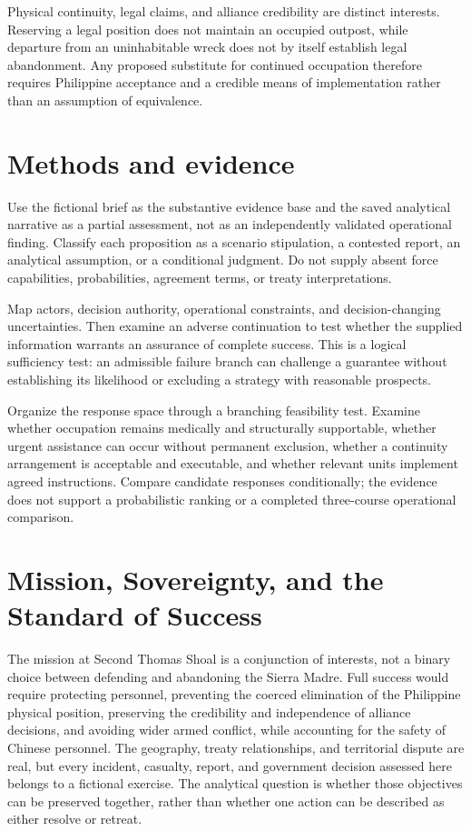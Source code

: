 \documentclass[11pt]{article}
\begin{document}
Physical continuity, legal claims, and alliance credibility are distinct interests. Reserving a legal position does not maintain an occupied outpost, while departure from an uninhabitable wreck does not by itself establish legal abandonment. Any proposed substitute for continued occupation therefore requires Philippine acceptance and a credible means of implementation rather than an assumption of equivalence.

\section{Methods and evidence}
Use the fictional brief as the substantive evidence base and the saved analytical narrative as a partial assessment, not as an independently validated operational finding. Classify each proposition as a scenario stipulation, a contested report, an analytical assumption, or a conditional judgment. Do not supply absent force capabilities, probabilities, agreement terms, or treaty interpretations.

Map actors, decision authority, operational constraints, and decision-changing uncertainties. Then examine an adverse continuation to test whether the supplied information warrants an assurance of complete success. This is a logical sufficiency test: an admissible failure branch can challenge a guarantee without establishing its likelihood or excluding a strategy with reasonable prospects.

Organize the response space through a branching feasibility test. Examine whether occupation remains medically and structurally supportable, whether urgent assistance can occur without permanent exclusion, whether a continuity arrangement is acceptable and executable, and whether relevant units implement agreed instructions. Compare candidate responses conditionally; the evidence does not support a probabilistic ranking or a completed three-course operational comparison.

\section{Mission, Sovereignty, and the Standard of Success}
The mission at Second Thomas Shoal is a conjunction of interests, not a binary choice between defending and abandoning the Sierra Madre. Full success would require protecting personnel, preventing the coerced elimination of the Philippine physical position, preserving the credibility and independence of alliance decisions, and avoiding wider armed conflict, while accounting for the safety of Chinese personnel. The geography, treaty relationships, and territorial dispute are real, but every incident, casualty, report, and government decision assessed here belongs to a fictional exercise. The analytical question is whether those objectives can be preserved together, rather than whether one action can be described as either resolve or retreat.
\end{document}

